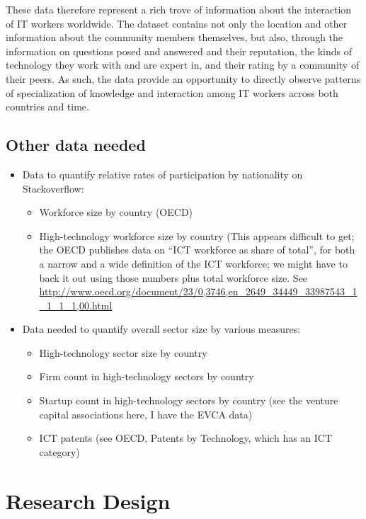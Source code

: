 \documentclass[11pt]{article}
\begin{document}
These data therefore represent a rich trove of information about the
interaction of IT workers worldwide. The dataset contains not only the location
and other information about the community members themselves, but also,
through the information on questions posed and answered and their reputation, the
kinds of technology they work with and are expert in, and their rating by
a community of their peers. As such, the data provide an opportunity
to directly observe patterns of specialization of knowledge and
interaction among IT workers across both countries and time. 

\subsection{Other data needed}
\label{sec:other-data-needed}

\begin{itemize}
\item Data to quantify relative rates of participation by
  nationality on Stackoverflow:
  \begin{itemize}
  \item Workforce size by country (OECD)
  \item High-technology workforce size by country (This appears
    difficult to get; the OECD publishes data on ``ICT workforce as
    share of total'', for both a narrow and a wide definition of the
    ICT workforce; we might have to back it out using those numbers
    plus total workforce size. See
    \url{http://www.oecd.org/document/23/0,3746,en_2649_34449_33987543_1_1_1_1,00.html}
  \end{itemize}
\item Data needed to quantify overall sector size by various measures:
  \begin{itemize}
  \item High-technology sector size by country
  \item Firm count in high-technology sectors by country
  \item Startup count in high-technology sectors by country (see the
    venture capital associations here, I have the EVCA data)
  \item ICT patents (see OECD, Patents by Technology, which has an ICT
    category)
  \end{itemize}
\end{itemize}


 


\section{Research Design}
\label{sec:research-design}
\end{document}
